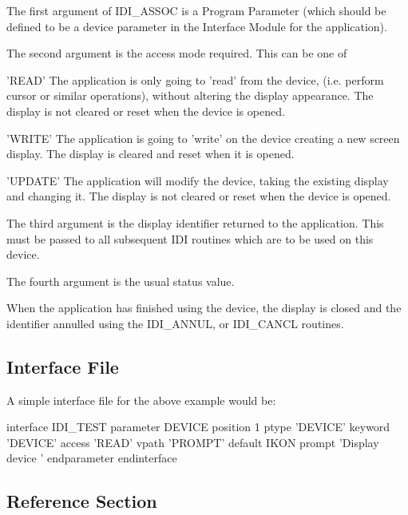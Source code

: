 \documentclass[11pt,nolof]{starlink}
\begin{document}
The first argument of IDI\_ASSOC is a Program Parameter (which should be
defined to be a device parameter in the Interface Module for the
application).

The second argument is the access mode required. This can be one of

\hspace*{20mm}\begin{minipage}{140mm}

\noindent
'READ' The application is only going to 'read' from the device, (i.e.
perform cursor or similar operations), without altering the display
appearance. The display is not cleared or reset when the device is
opened.

'WRITE' The application is going to 'write' on the device creating
a new screen display. The display is cleared and reset when it
is opened.

'UPDATE' The application will modify the device, taking the existing
display and changing it. The display is not cleared or reset when the
device is opened.

\end{minipage}

The third argument is the display identifier returned to the application.
This must be passed to all subsequent IDI routines which are to be used
on this device.

The fourth argument is the usual status value.

When the application has finished using the device, the display is closed
and the identifier annulled using the IDI\_ANNUL, or IDI\_CANCL routines.

\subsection{Interface File}

A simple interface file for the above example would be:

\begin{small}
\begin{terminalv}
interface IDI_TEST
   parameter DEVICE
      position 1
      ptype  'DEVICE'
      keyword 'DEVICE'
      access 'READ'
      vpath 'PROMPT'
      default IKON
      prompt 'Display device '
   endparameter
endinterface
\end{terminalv}
\end{small}

\subsection{Reference Section}
\end{document}
